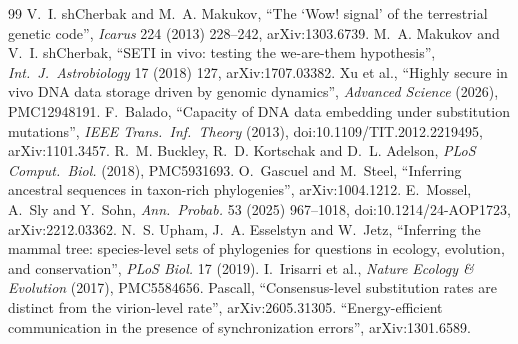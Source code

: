 \documentclass[11pt]{article}
\begin{document}
\begin{thebibliography}{99}
 V.~I. shCherbak and M.~A. Makukov, ``The `Wow! signal' of the terrestrial genetic code'', \emph{Icarus} 224 (2013) 228--242, arXiv:1303.6739.
 M.~A. Makukov and V.~I. shCherbak, ``SETI in vivo: testing the we-are-them hypothesis'', \emph{Int.\ J.\ Astrobiology} 17 (2018) 127, arXiv:1707.03382.
 Xu et al., ``Highly secure in vivo DNA data storage driven by genomic dynamics'', \emph{Advanced Science} (2026), PMC12948191.
 F.~Balado, ``Capacity of DNA data embedding under substitution mutations'', \emph{IEEE Trans.\ Inf.\ Theory} (2013), doi:10.1109/TIT.2012.2219495, arXiv:1101.3457.
 R.~M. Buckley, R.~D. Kortschak and D.~L. Adelson, \emph{PLoS Comput.\ Biol.} (2018), PMC5931693.
 O.~Gascuel and M.~Steel, ``Inferring ancestral sequences in taxon-rich phylogenies'', arXiv:1004.1212.
 E.~Mossel, A.~Sly and Y.~Sohn, \emph{Ann.\ Probab.} 53 (2025) 967--1018, doi:10.1214/24-AOP1723, arXiv:2212.03362.
 N.~S. Upham, J.~A. Esselstyn and W.~Jetz, ``Inferring the mammal tree: species-level sets of phylogenies for questions in ecology, evolution, and conservation'', \emph{PLoS Biol.} 17 (2019).
 I.~Irisarri et al., \emph{Nature Ecology \& Evolution} (2017), PMC5584656.
 Pascall, ``Consensus-level substitution rates are distinct from the virion-level rate'', arXiv:2605.31305.
 ``Energy-efficient communication in the presence of synchronization errors'', arXiv:1301.6589.
\end{thebibliography}
\end{document}
